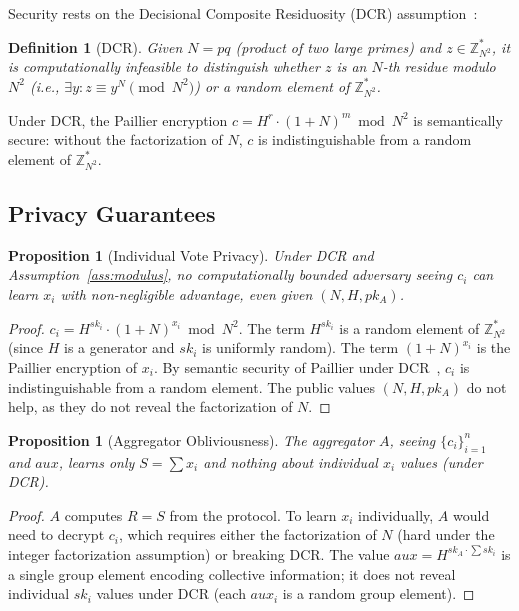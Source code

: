 \documentclass[11pt, a4paper]{article}
\newtheorem{proposition}[theorem]{Proposition}
\newtheorem{definition}[theorem]{Definition}
\begin{document}
Security rests on the Decisional Composite Residuosity (DCR) assumption~\cite{paillier1999public}:

\begin{definition}[DCR]
Given $N = pq$ (product of two large primes) and $z \in \mathbb{Z}_{N^2}^*$, it is computationally infeasible to distinguish whether $z$ is an $N$-th residue modulo $N^2$ (i.e., $\exists y : z \equiv y^N \pmod{N^2}$) or a random element of $\mathbb{Z}_{N^2}^*$.
\end{definition}

Under DCR, the Paillier encryption $c = H^r \cdot (1+N)^m \bmod N^2$ is semantically secure: without the factorization of $N$, $c$ is indistinguishable from a random element of $\mathbb{Z}_{N^2}^*$.

\subsection{Privacy Guarantees}

\begin{proposition}[Individual Vote Privacy]\label{prop:privacy}
Under DCR and Assumption~\ref{ass:modulus}, no computationally bounded adversary seeing $c_i$ can learn $x_i$ with non-negligible advantage, even given $(N, H, pk_A)$.
\end{proposition}

\begin{proof}
$c_i = H^{sk_i} \cdot (1+N)^{x_i} \bmod N^2$. The term $H^{sk_i}$ is a random element of $\mathbb{Z}_{N^2}^*$ (since $H$ is a generator and $sk_i$ is uniformly random). The term $(1+N)^{x_i}$ is the Paillier encryption of $x_i$. By semantic security of Paillier under DCR~\cite{paillier1999public}, $c_i$ is indistinguishable from a random element. The public values $(N, H, pk_A)$ do not help, as they do not reveal the factorization of $N$.
\end{proof}

\begin{proposition}[Aggregator Obliviousness]\label{prop:agg}
The aggregator $A$, seeing $\{c_i\}_{i=1}^n$ and $aux$, learns only $S = \sum x_i$ and nothing about individual $x_i$ values (under DCR).
\end{proposition}

\begin{proof}
$A$ computes $R = S$ from the protocol. To learn $x_i$ individually, $A$ would need to decrypt $c_i$, which requires either the factorization of $N$ (hard under the integer factorization assumption) or breaking DCR. The value $aux = H^{sk_A \cdot \sum sk_i}$ is a single group element encoding collective information; it does not reveal individual $sk_i$ values under DCR (each $aux_i$ is a random group element).
\end{proof}
\end{document}
